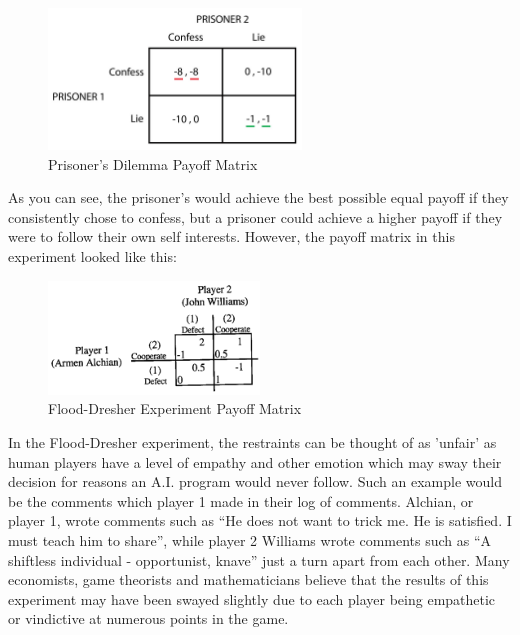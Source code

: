 \documentclass[12pt,a4paper]{article}
\begin{document}
\begin{figure}[h]
	\centering
		\includegraphics[width=0.6\textwidth]{DilemmaPayoffMatrix}
		\caption{Prisoner's Dilemma Payoff Matrix}
\end{figure}

\noindent
As you can see, the prisoner's would achieve the best possible equal payoff if they consistently chose to confess, but a prisoner could achieve a higher payoff if they were to follow their own self interests. However, the payoff matrix in this experiment looked like this:

\begin{figure}[H]
	\centering
		\includegraphics[width=0.5\textwidth]{FloodDresherPayoff}
		\caption{Flood-Dresher Experiment Payoff Matrix\cite[p.~184]{13}}
\end{figure}

\noindent
In the Flood-Dresher experiment, the restraints can be thought of as 'unfair' as human players have a level of empathy and other emotion which may sway their decision for reasons an A.I. program would never follow. Such an example would be the comments which player 1 made in their log of comments. Alchian, or player 1, wrote comments such as “He does not want to trick me. He is satisfied. I must teach him to share”, while player 2 Williams wrote comments such as “A shiftless individual - opportunist, knave”\cite[p.~189]{13} just a turn apart from each other. Many economists, game theorists and mathematicians believe that the results of this experiment may have been swayed slightly due to each player being empathetic or vindictive at numerous points in the game. \\
\end{document}
